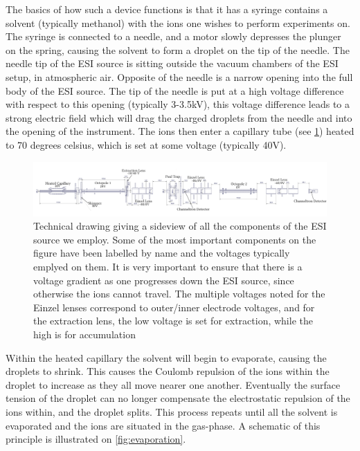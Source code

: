The basics of how such a device functions is that it has a syringe contains a solvent (typically methanol) with the ions one wishes to perform experiments on. The syringe is connected to a needle, and a motor slowly depresses the plunger on the spring, causing the solvent to form a droplet on the tip of the needle. The needle tip of the ESI source is sitting outside the vacuum chambers of the ESI setup, in atmospheric air.
Opposite of the needle is a narrow opening into the full body of the ESI source. The tip of the needle is put at a high voltage difference with respect to this opening (typically 3-3.5kV), this voltage difference leads to a strong electric field which will drag the charged droplets from the needle and into the opening of the instrument.
The ions then enter a capillary tube (see \cref{fig:esiDrawing}) heated to 70 degrees celsius, which is set at some voltage (typically 40V).
\begin{figure}
    \centering
    \includegraphics[width = 1.1\textwidth]{main/electrospray_elements.pdf}
    \caption{Technical drawing giving a sideview of all the components of the ESI source we employ. Some of the most important components on the figure have been labelled by name and the voltages typically emplyed on them.
    It is very important to ensure that there is a voltage gradient as one progresses down the ESI source, since otherwise the ions cannot travel. The multiple voltages noted for the Einzel lenses correspond to outer/inner electrode voltages, and for the extraction lens, the low voltage is set for extraction, while the high is for accumulation}
    \label{fig:esiDrawing}
\end{figure}
Within the heated capillary the solvent will begin to evaporate, causing the droplets to shrink. This causes the Coulomb repulsion of the ions within the droplet to increase as they all move nearer one another.
Eventually the surface tension of the droplet can no longer compensate the electrostatic repulsion of the ions within, and the droplet splits. This process repeats until all the solvent is evaporated and the ions are situated in the gas-phase. A schematic of this principle is illustrated on \cref{fig:evaporation}.
